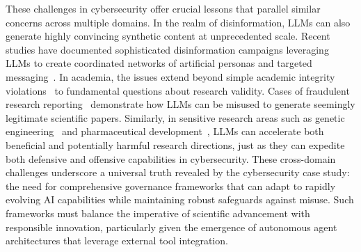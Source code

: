 These challenges in cybersecurity offer crucial lessons that parallel similar concerns across multiple domains. In the realm of disinformation, LLMs can also generate highly convincing synthetic content at unprecedented scale. Recent studies have documented sophisticated disinformation campaigns leveraging LLMs to create coordinated networks of artificial personas and targeted messaging~\cite{atinstitute}. In academia, the issues extend beyond simple academic integrity violations~\cite{uchiacademic} to fundamental questions about research validity. Cases of fraudulent research reporting~\cite{majovsky2023artificial} demonstrate how LLMs can be misused to generate seemingly legitimate scientific papers. Similarly, in sensitive research areas such as genetic engineering~\cite{sandbrink2023artificial} and pharmaceutical development~\cite{anibal2024simulated}, LLMs can accelerate both beneficial and potentially harmful research directions, just as they can expedite both defensive and offensive capabilities in cybersecurity. These cross-domain challenges underscore a universal truth revealed by the cybersecurity case study: the need for comprehensive governance frameworks that can adapt to rapidly evolving AI capabilities while maintaining robust safeguards against misuse. Such frameworks must balance the imperative of scientific advancement with responsible innovation, particularly given the emergence of autonomous agent architectures that leverage external tool integration.

